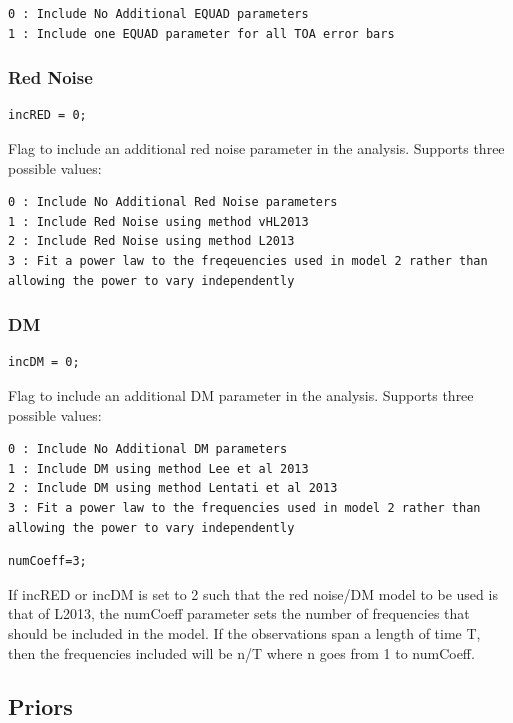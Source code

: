 \documentclass[%
 preprint,
 amsmath,amssymb,amsfonts,
 aps,
]{revtex4-1}
\begin{document}
\begin{lstlisting}
0 : Include No Additional EQUAD parameters 
1 : Include one EQUAD parameter for all TOA error bars
\end{lstlisting}

\subsubsection{Red Noise}

\begin{lstlisting}
incRED = 0;
\end{lstlisting}

Flag to include an additional red noise parameter in the analysis.  Supports three possible values:

\begin{lstlisting}
0 : Include No Additional Red Noise parameters 
1 : Include Red Noise using method vHL2013
2 : Include Red Noise using method L2013
3 : Fit a power law to the freqeuencies used in model 2 rather than allowing the power to vary independently
\end{lstlisting}

\subsubsection{DM}

\begin{lstlisting}
incDM = 0;
\end{lstlisting}

Flag to include an additional DM parameter in the analysis.  Supports three possible values:

\begin{lstlisting}
0 : Include No Additional DM parameters 
1 : Include DM using method Lee et al 2013
2 : Include DM using method Lentati et al 2013
3 : Fit a power law to the frequencies used in model 2 rather than allowing the power to vary independently
\end{lstlisting}

\begin{lstlisting}
numCoeff=3;
\end{lstlisting}
%
If incRED or incDM is set to 2 such that the red noise/DM model to be used is that of L2013, the numCoeff parameter sets the number of frequencies that should be included in the model.  If the observations span a length of time T, then the frequencies included will be n/T where n goes from 1 to numCoeff.

\subsection{Priors}
\end{document}
